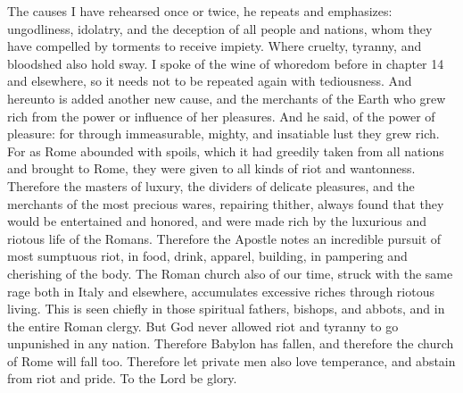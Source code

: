 The causes I have rehearsed once or twice, he repeats and emphasizes: ungodliness, idolatry, and the deception of all people and nations, whom they have compelled by torments to receive impiety. Where cruelty, tyranny, and bloodshed also hold sway. I spoke of the wine of whoredom before in chapter 14 and elsewhere, so it needs not to be repeated again with tediousness. And hereunto is added another new cause, and the merchants of the Earth who grew rich from the power or influence of her pleasures. And he said, of the power of pleasure: for through immeasurable, mighty, and insatiable lust they grew rich. For as Rome abounded with spoils, which it had greedily taken from all nations and brought to Rome, they were given to all kinds of riot and wantonness. Therefore the masters of luxury, the dividers of delicate pleasures, and the merchants of the most precious wares, repairing thither, always found that they would be entertained and honored, and were made rich by the luxurious and riotous life of the Romans. Therefore the Apostle notes an incredible pursuit of most sumptuous riot, in food, drink, apparel, building, in pampering and cherishing of the body. The Roman church also of our time, struck with the same rage both in Italy and elsewhere, accumulates excessive riches through riotous living. This is seen chiefly in those spiritual fathers, bishops, and abbots, and in the entire Roman clergy. But God never allowed riot and tyranny to go unpunished in any nation. Therefore Babylon has fallen, and therefore the church of Rome will fall too. Therefore let private men also love temperance, and abstain from riot and pride. To the Lord be glory.
